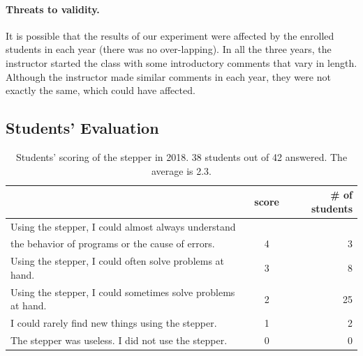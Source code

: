 \paragraph{Threats to validity.}
It is possible that the results of our experiment were affected by the enrolled students in each year (there was no over-lapping).
In all the three years, 
the instructor started the class with some introductory comments that
vary in length.
Although the instructor made similar comments in each year, they were
not exactly the same, which could have affected.

\subsection{Students' Evaluation}

\begin{table}
  \begin{center}
  \begin{tabular}{|l|c|r|}
    \hline
    & score & \# of students \\ \hline
    Using the stepper, I could almost always understand & & \\
    the behavior of programs or the cause of errors. & 4 & 3 \\ \hline
    Using the stepper, I could often solve problems at hand. & 3 & 8\\ \hline
    Using the stepper, I could sometimes solve problems at hand. & 2 & 25\\ \hline
    I could rarely find new things using the stepper. & 1 & 2\\ \hline
    The stepper was useless.  I did not use the stepper. & 0 & 0\\ \hline
  \end{tabular}
  \end{center}
  \caption{Students' scoring of the stepper in 2018.
  38 students out of 42 answered.
  The average is 2.3.}
  \label{TableScore}
\end{table}

